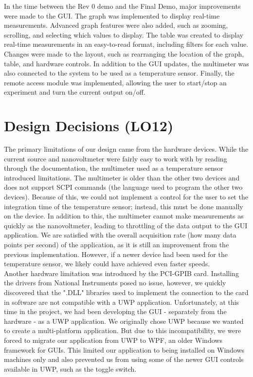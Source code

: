 \documentclass{article}
\begin{document}
\noindent In the time between the Rev 0 demo and the Final Demo, major improvements were made to the GUI. The graph was implemented to display real-time measurements. Advanced graph features were also added, such as zooming, scrolling, and selecting which values to display. The table was created to display real-time measurements in an easy-to-read format, including filters for each value. Changes were made to the layout, such as rearranging the location of the graph, table, and hardware controls. In addition to the GUI updates, the multimeter was also connected to the system to be used as a temperature sensor. Finally, the remote access module was implemented, allowing the user to start/stop an experiment and turn the current output on/off. 

\section{Design Decisions (LO12)}


 \noindent The primary limitations of our design came from the hardware devices. While the current source and nanovoltmeter were fairly easy to work with by reading through the documentation, the multimeter used as a temperature sensor introduced limitations. The multimeter is older than the other two devices and does not support SCPI commands (the language used to program the other two devices). Because of this, we could not implement a control for the user to set the integration time of the temperature sensor; instead, this must be done manually on the device. In addition to this, the multimeter cannot make measurements as quickly as the nanovoltmeter, leading to throttling of the data output to the GUI application. We are satisfied with the overall acquisition rate (how many data points per second) of the application, as it is still an improvement from the previous implementation. However, if a newer device had been used for the temperature sensor, we likely could have achieved even faster speeds.\\

 \noindent Another hardware limitation was introduced by the PCI-GPIB card. Installing the drivers from National Instruments posed no issue, however, we quickly discovered that the ".DLL" libraries used to implement the connection to the card in software are not compatible with a UWP application. Unfortunately, at this time in the project, we had been developing the GUI - separately from the hardware - as a UWP application. We originally chose UWP because we wanted to create a multi-platform application. But due to this incompatibility, we were forced to migrate our application from UWP to WPF, an older Windows framework for GUIs. This limited our application to being installed on Windows machines only and also prevented us from using some of the newer GUI controls available in UWP, such as the toggle switch. \\
\end{document}

